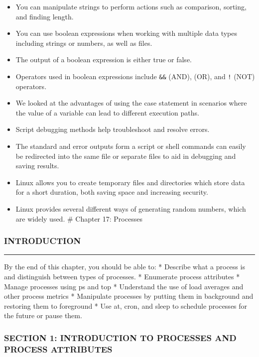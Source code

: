 \begin{itemize}
\itemsep1pt\parskip0pt
\item
  You can manipulate strings to perform actions such as comparison,
  sorting, and finding length.
\item
  You can use boolean expressions when working with multiple data types
  including strings or numbers, as well as files.
\item
  The output of a boolean expression is either true or false.
\item
  Operators used in boolean expressions include \texttt{\&\&} (AND),
  \texttt{\textbar{}\textbar{}} (OR), and \texttt{!} (NOT) operators.
\item
  We looked at the advantages of using the case statement in scenarios
  where the value of a variable can lead to different execution paths.
\item
  Script debugging methods help troubleshoot and resolve errors.
\item
  The standard and error outputs form a script or shell commands can
  easily be redirected into the same file or separate files to aid in
  debugging and saving results.
\item
  Linux allows you to create temporary files and directories which store
  data for a short duration, both saving space and increasing security.
\item
  Linux provides several different ways of generating random numbers,
  which are widely used. \# Chapter 17: Processes
\end{itemize}

\subsubsection{INTRODUCTION}\label{introduction-16}

\begin{center}\rule{3in}{0.4pt}\end{center}

By the end of this chapter, you should be able to: * Describe what a
process is and distinguish between types of processes. * Enumerate
process attributes * Manage processes using ps and top * Understand the
use of load averages and other process metrics * Manipulate processes by
putting them in background and restoring them to foreground * Use at,
cron, and sleep to schedule processes for the future or pause them.

\subsubsection{SECTION 1: INTRODUCTION TO PROCESSES AND PROCESS
ATTRIBUTES}\label{section-1-introduction-to-processes-and-process-attributes}

